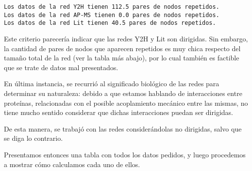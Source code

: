 \documentclass[11pt]{article}
\begin{document}
    \begin{Verbatim}[commandchars=\\\{\}]
Los datos de la red Y2H tienen 112.5 pares de nodos repetidos.
Los datos de la red AP-MS tienen 0.0 pares de nodos repetidos.
Los datos de la red Lit tienen 40.5 pares de nodos repetidos.

    \end{Verbatim}

    Este criterio parecería indicar que las redes Y2H y Lit son dirigidas.
Sin embargo, la cantidad de pares de nodos que aparecen repetidos es muy
chica respecto del tamaño total de la red (ver la tabla más abajo), por
lo cual también es factible que se trate de datos mal presentados.

En última instancia, se recurrió al significado biológico de las redes
para determinar su naturaleza: debido a que estamos hablando de
interacciones entre proteínas, relacionadas con el posible acoplamiento
mecánico entre las mismas, no tiene mucho sentido considerar que dichas
interacciones puedan ser dirigidas.

De esta manera, se trabajó con las redes considerándolas no dirigidas,
salvo que se diga lo contrario.

    Presentamos entonces una tabla con todos los datos pedidos, y luego
procedemos a mostrar cómo calculamos cada uno de ellos.
\end{document}
